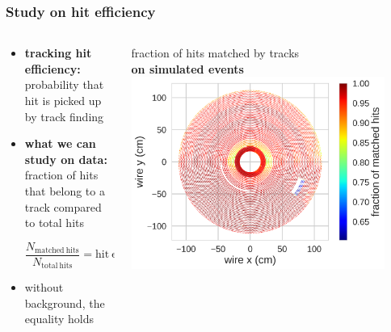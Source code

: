 \documentclass[18pt, aspectratio=169]{beamer}
\newcommand{\kitemph}[1]{\textcolor{kit-green100}{\bf{#1}}}
\begin{document}
\begin{frame}
  \frametitle{Study on hit efficiency}
  \begin{columns}
    \begin{column}{0.5\textwidth}
      \begin{itemize}
      \item \textbf{tracking hit efficiency:}\\
        probability that hit is picked up by track finding
      \item \textbf{what we can study on data:}\\
        fraction of hits that belong to a track compared to total hits

        \begin{equation*}
          \frac{N_\mathrm{matched\ hits}}{N_\mathrm{total\ hits}} = \mathrm{hit\ efficiency} \times \frac{N_\mathrm{hits\ from\ tracks}}{N_\mathrm{total\ hits}}
        \end{equation*}
      \item without background, the equality holds
      \end{itemize}

    \end{column}
    \begin{column}{0.5\textwidth}
      \centering
      fraction of hits matched by tracks\\
      \kitemph{on simulated events}\\
      \includegraphics[width=0.9\textwidth]{figures/hit_efficiency_by_wire/gcr1_2017-08/hit_ratio_matched_by_recotrack_MC.png}
    \end{column}
  \end{columns}

\end{frame}
\end{document}
